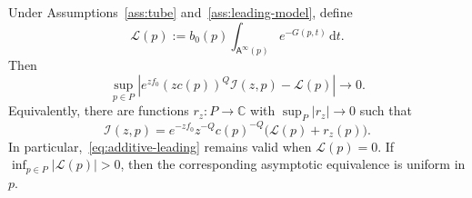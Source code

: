 \documentclass[10pt,a4paper]{amsart}
\newcommand{\Afib}{\mathsf{A}}
\newcommand{\C}{\mathbb{C}}
\newcommand{\cI}{\mathcal{I}}
\newcommand{\cL}{\mathcal{L}}
\newcommand{\dd}{\,\mathrm{d}}
\begin{document}
\begin{corollary}
\label{cor:coercive-leading-piece}
Under Assumptions~\ref{ass:tube} and~\ref{ass:leading-model}, define
\begin{equation}\label{eq:leading-profile}
  \cL(p):=b_0(p)\int_{\Afib^\infty(p)}e^{-G(p,t)}\dd t.
\end{equation}
Then
\begin{equation}\label{eq:uniform-leading}
  \sup_{p\in P}\left|
  e^{zf_0}(zc(p))^Q\cI(z,p)-\cL(p)
  \right|\longrightarrow0.
\end{equation}
Equivalently, there are functions $r_z:P\to\C$ with
$\sup_P|r_z|\to0$ such that
\begin{equation}\label{eq:additive-leading}
  \cI(z,p)=e^{-zf_0}z^{-Q}c(p)^{-Q}\bigl(\cL(p)+r_z(p)\bigr).
\end{equation}
In particular,~\eqref{eq:additive-leading} remains valid when $\cL(p)=0$.  If
$\inf_{p\in P}|\cL(p)|>0$, then the corresponding asymptotic equivalence is
uniform in $p$.
\end{corollary}
\end{document}

